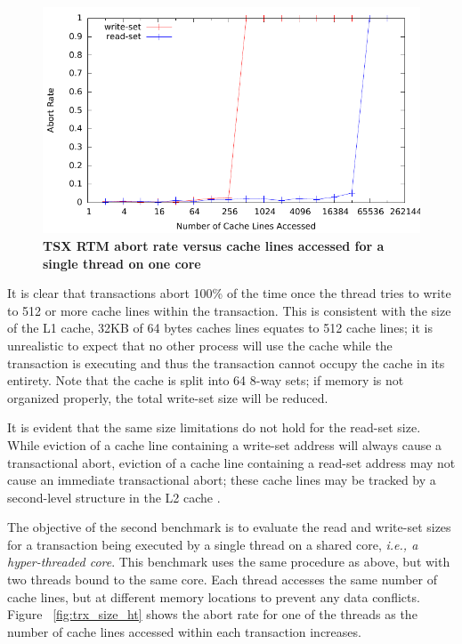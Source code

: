 \documentclass[11pt]{book}
\begin{document}
\begin{figure}[H]
    \centering
    \graphicspath{ {./figures/} }
    \includegraphics[totalheight=0.50\textheight,keepaspectratio]{trxSize_singleThread}
    \caption{\textbf{TSX RTM abort rate versus cache lines accessed for a single
    thread on one core}}
    \label{fig:trx_size}
\end{figure}

It is clear that transactions abort 100\% of the time once the thread tries to write to
512 or more cache lines within the transaction.  This is consistent with the size of the
L1 cache, 32KB of 64 bytes caches lines equates to 512 cache lines; it is unrealistic to
expect that no other process will use the cache while the transaction is executing and
thus the transaction cannot occupy the cache in its entirety.  Note that the cache is
split into 64 8-way sets; if memory is not organized properly, the total write-set size
will be reduced.

It is evident that the same size limitations do not hold for the read-set size.
While eviction of a cache line containing a write-set address will always cause a
transactional abort, eviction of a cache line containing a read-set address may not cause
an immediate transactional abort; these cache lines may be tracked by a second-level
structure in the L2 cache \cite{intel_opt_man}.

The objective of the second benchmark is to evaluate the read and write-set
sizes for a transaction being executed by a single thread on a shared core,
\emph{i.e., a hyper-threaded core}.  This benchmark uses the same procedure as
above, but with two threads bound to the same core.  Each thread accesses the
same number of cache lines, but at different memory locations to prevent any
data conflicts. Figure ~\ref{fig:trx_size_ht} shows the abort rate for one of
the threads as the number of cache lines accessed within each transaction
increases.
\end{document}
